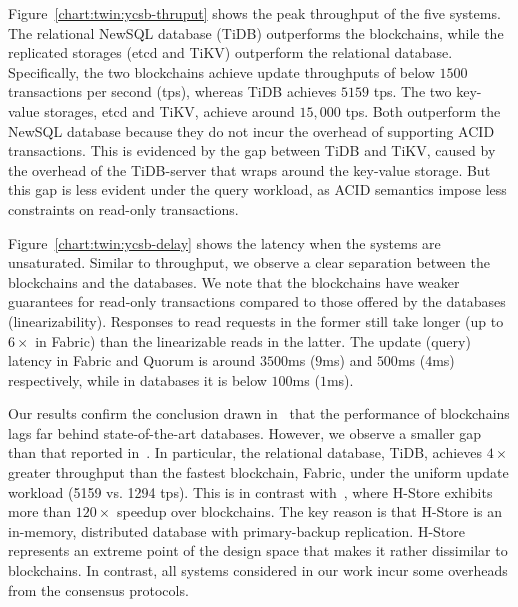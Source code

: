 Figure~\ref{chart:twin:ycsb-thruput} shows the peak throughput of the five systems.
The relational NewSQL database (TiDB) outperforms the blockchains, while the
replicated storages (etcd and TiKV) outperform the relational database.
Specifically, the two blockchains achieve update throughputs of below $1500$
transactions per second (tps), whereas TiDB achieves $5159$ tps.
The two key-value storages, etcd and TiKV, achieve around $15,000$ tps.
Both outperform the NewSQL database because they do not incur the overhead of
supporting ACID transactions.
This is evidenced by the gap between TiDB and TiKV, caused by the overhead of
the TiDB-server that wraps around the key-value storage.
But this gap is less evident under the query workload, as ACID semantics impose
less constraints on read-only transactions.

Figure~\ref{chart:twin:ycsb-delay} shows the latency when the systems are unsaturated.
Similar to throughput, we observe a clear separation between the blockchains and
the databases.
We note that the blockchains have weaker guarantees for read-only transactions
compared to those offered by the databases (linearizability).
Responses to read requests in the former still take longer (up to $6\times$ in
Fabric) than the linearizable reads in the latter.
The update (query) latency in Fabric and Quorum is around $3500$ms ($9$ms) and
$500$ms ($4$ms) respectively, while in databases it is below $100$ms ($1$ms).

Our results confirm the conclusion drawn in~\cite{dinh2017blockbench} that the
performance of blockchains lags far behind state-of-the-art databases.
However, we observe a smaller gap than that reported
in~\cite{dinh2017blockbench}.
In particular, the relational database, TiDB, achieves $4\times$ greater
throughput than the fastest blockchain, Fabric, under the uniform update
workload (5159 vs.
1294 tps).
This is in contrast with~\cite{dinh2017blockbench}, where H-Store exhibits more
than $120\times$ speedup over blockchains.
The key reason is that H-Store is an in-memory, distributed database with
primary-backup replication.
H-Store represents an extreme point of the design space that makes it rather
dissimilar to blockchains.
In contrast, all systems considered in our work incur some overheads from the
consensus protocols.

